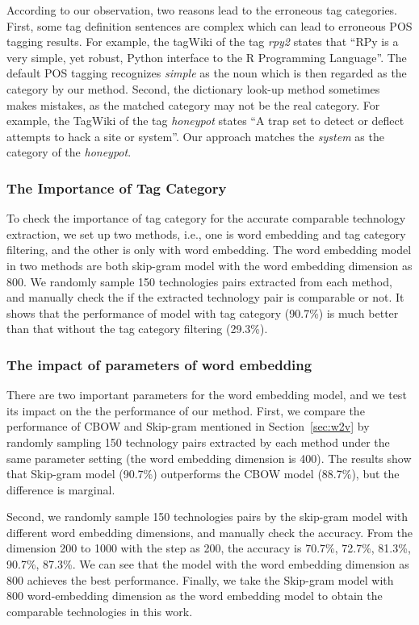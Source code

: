 According to our observation, two reasons lead to the erroneous tag categories.
First, some tag definition sentences are complex which can lead to erroneous POS tagging results.
For example, the tagWiki of the tag \textit{rpy2} states that ``RPy is a very simple, yet robust, Python interface to the R Programming Language''. 
The default POS tagging	recognizes \textit{simple} as the noun which is then regarded as the category by our method.
Second, the dictionary look-up method sometimes makes mistakes, as the matched category may not be the real category.
For example, the TagWiki of the tag \textit{honeypot} states ``A trap set to detect or deflect attempts to hack a site or system''.
Our approach matches the \textit{system} as the category of the \textit{honeypot}.

\subsubsection{The Importance of Tag Category}
To check the importance of tag category for the accurate comparable technology extraction, we set up two methods, i.e., one is word embedding and tag category filtering, and the other is only with word embedding.
The word embedding model in two methods are both skip-gram model with the word embedding dimension as 800.  
We randomly sample 150 technologies pairs extracted from each method, and manually check the if the extracted technology pair is comparable or not.
It shows that the performance of model with tag category (90.7\%) is much better than that without the tag category filtering (29.3\%).

\subsubsection{The impact of parameters of word embedding}
\label{sec:comparison_w2v}
There are two important parameters for the word embedding model, and we test its impact on the the performance of our method.
First, we compare the performance of CBOW and Skip-gram mentioned in Section~\ref{sec:w2v} by randomly sampling 150 technology pairs extracted by each method under the same parameter setting (the word embedding dimension is 400).
The results show that Skip-gram model (90.7\%) outperforms the CBOW model (88.7\%), but the difference is marginal.

Second, we randomly sample 150 technologies pairs by the skip-gram model with different word embedding dimensions, and manually check the accuracy.
From the dimension 200 to 1000 with the step as 200, the accuracy is 70.7\%, 72.7\%, 81.3\%, 90.7\%, 87.3\%.
We can see that the model with the word embedding dimension as 800 achieves the best performance.
Finally, we take the Skip-gram model with 800 word-embedding dimension as the word embedding model to obtain the comparable technologies in this work.   

